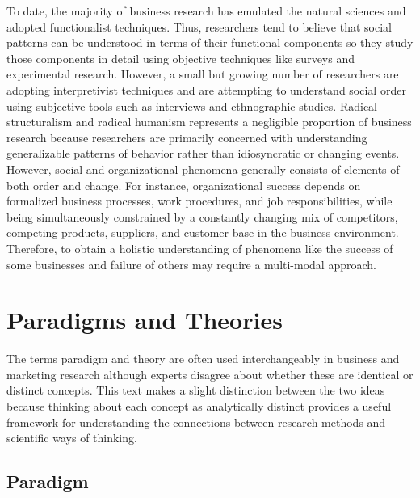 To date, the majority of business research has emulated the natural sciences and adopted functionalist techniques. Thus, researchers tend to believe that social patterns can be understood in terms of their functional components so they study those components in detail using objective techniques like surveys and experimental research. However, a small but growing number of researchers are adopting interpretivist techniques and are attempting to understand social order using subjective tools such as interviews and ethnographic studies. Radical structuralism and radical humanism represents a negligible proportion of business research because researchers are primarily concerned with understanding generalizable patterns of behavior rather than idiosyncratic or changing events. However, social and organizational phenomena generally consists of elements of both order and change. For instance, organizational success depends on formalized business processes, work procedures, and job responsibilities, while being simultaneously constrained by a constantly changing mix of competitors, competing products, suppliers, and customer base in the business environment. Therefore, to obtain a holistic understanding of phenomena like the success of some businesses and failure of others may require a multi-modal approach.

\section{Paradigms and Theories}

The terms \gls{paradigm} and \gls{theory} are often used interchangeably in business and marketing research although experts disagree about whether these are identical or distinct concepts. This text makes a slight distinction between the two ideas because thinking about each concept as analytically distinct provides a useful framework for understanding the connections between research methods and scientific ways of thinking.

\subsection{Paradigm}

